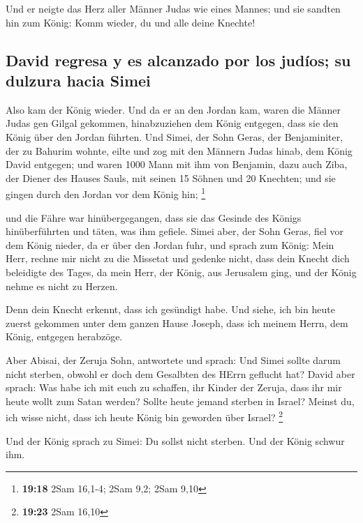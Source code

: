  Und er neigte das Herz aller Männer Judas wie eines
Mannes; und sie sandten hin zum König: Komm wieder, du und alle deine
Knechte!

\hypertarget{david-regresa-y-es-alcanzado-por-los-juduxedos-su-dulzura-hacia-simei}{%
\subsection{David regresa y es alcanzado por los judíos; su dulzura
hacia
Simei}\label{david-regresa-y-es-alcanzado-por-los-juduxedos-su-dulzura-hacia-simei}}

 Also kam der König wieder. Und da er an den Jordan kam,
waren die Männer Judas gen Gilgal gekommen, hinabzuziehen dem König
entgegen, dass sie den König über den Jordan führten. 
Und Simei, der Sohn Geras, der Benjaminiter, der zu Bahurim wohnte,
eilte und zog mit den Männern Judas hinab, dem König David entgegen;
 und waren 1000 Mann mit ihm von Benjamin, dazu auch
Ziba, der Diener des Hauses Sauls, mit seinen 15 Söhnen und 20 Knechten;
und sie gingen durch den Jordan vor dem König hin; \footnote{\textbf{19:18}
  2Sam 16,1-4; 2Sam 9,2; 2Sam 9,10}

 und die Fähre war hinübergegangen, dass sie das Gesinde
des Königs hinüberführten und täten, was ihm gefiele. Simei aber, der
Sohn Geras, fiel vor dem König nieder, da er über den Jordan fuhr,
 und sprach zum König: Mein Herr, rechne mir nicht zu die
Missetat und gedenke nicht, dass dein Knecht dich beleidigte des Tages,
da mein Herr, der König, aus Jerusalem ging, und der König nehme es
nicht zu Herzen.

 Denn dein Knecht erkennt, dass ich gesündigt habe. Und
siehe, ich bin heute zuerst gekommen unter dem ganzen Hause Joseph, dass
ich meinem Herrn, dem König, entgegen herabzöge.

 Aber Abisai, der Zeruja Sohn, antwortete und sprach: Und
Simei sollte darum nicht sterben, obwohl er doch dem Gesalbten des HErrn
geflucht hat?  David aber sprach: Was habe ich mit euch
zu schaffen, ihr Kinder der Zeruja, dass ihr mir heute wollt zum Satan
werden? Sollte heute jemand sterben in Israel? Meinst du, ich wisse
nicht, dass ich heute König bin geworden über Israel? \footnote{\textbf{19:23}
  2Sam 16,10}

 Und der König sprach zu Simei: Du sollst nicht sterben.
Und der König schwur ihm.

